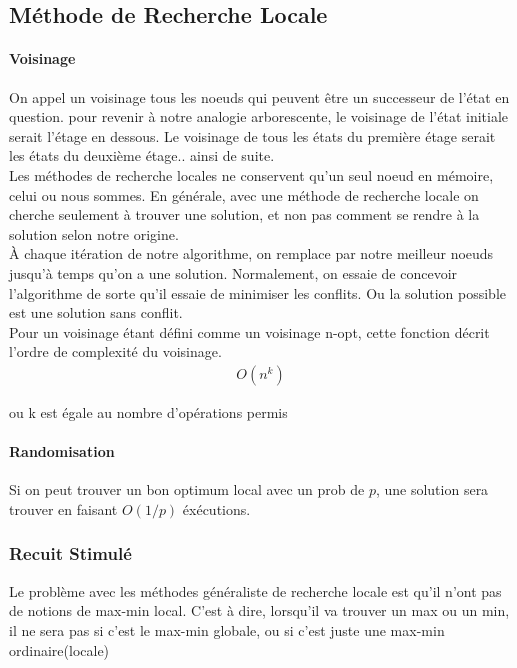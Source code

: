 \documentclass[oneside]{book}
\begin{document}
\subsection{Méthode de Recherche Locale}
\paragraph{Voisinage}
On appel un voisinage tous les noeuds qui peuvent être un successeur de l'état en question. pour revenir à notre analogie arborescente, le voisinage de l'état initiale serait l'étage en dessous. Le voisinage de tous les états du première étage serait les états du deuxième étage.. ainsi de suite.\\

Les méthodes de recherche locales ne conservent qu'un seul noeud en mémoire, celui ou nous sommes. En générale, avec une méthode de recherche locale on cherche seulement à trouver une solution, et non pas comment se rendre à la solution selon notre origine.\\

À chaque itération de notre algorithme, on remplace par notre meilleur noeuds jusqu'à temps qu'on a une solution. Normalement, on essaie de concevoir l'algorithme de sorte qu'il essaie de minimiser les conflits. Ou la solution possible est une solution sans conflit. \\

\noindent
Pour un voisinage étant défini comme un voisinage n-opt, cette fonction décrit l'ordre de complexité du voisinage.
\begin{align*}
O(n^k)
\end{align*}
\begin{center}
ou k est égale au nombre d'opérations permis
\end{center}

\paragraph{Randomisation} Si on peut trouver un bon optimum local avec un prob de $p$, une solution sera trouver en faisant $O(1/p)$ éxécutions.

\subsubsection{Recuit Stimulé}
Le problème avec les méthodes généraliste de recherche locale est qu'il n'ont pas de notions de max-min local. C'est à dire, lorsqu'il va trouver un max ou un min, il ne sera pas si c'est le max-min globale, ou si c'est juste une max-min ordinaire(locale) 
\end{document}
